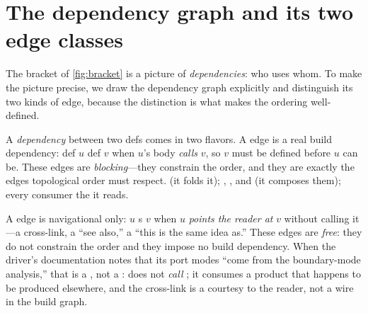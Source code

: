 \section{The dependency graph and its two edge classes}
\label{sec:depgraph}

The bracket of \cref{fig:bracket} is a picture of \emph{dependencies}: who uses
whom. To make the picture precise, we draw the dependency graph explicitly and
distinguish its two kinds of edge, because the distinction is what makes the
ordering well-defined.

A \emph{dependency} between two defs comes in two flavors. A \textbf{}
edge is a real build dependency: def $u$  def $v$ when $u$'s body
\emph{calls} $v$, so $v$ must be defined before $u$ can be. These edges are
\emph{blocking}---they constrain the order, and they are exactly the edges
topological order must respect.  
 (it folds it);  
, , and  (it composes
them); every consumer  the  it reads.

A \textbf{} edge is navigational only: $u$ s $v$
when $u$ \emph{points the reader at} $v$ without calling it---a cross-link, a ``see
also,'' a ``this is the same idea as.'' These edges are \emph{free}: they do not
constrain the order and they impose no build dependency. When the 
driver's documentation notes that its port modes ``come from the boundary-mode
analysis,'' that is a , not a :  does
not \emph{call} ; it consumes a product that happens to be
produced elsewhere, and the cross-link is a courtesy to the reader, not a wire in
the build graph.

